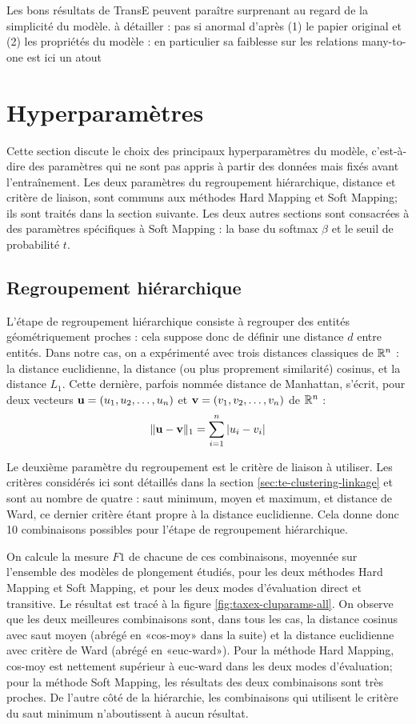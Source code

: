 Les bons résultats de TransE peuvent paraître surprenant au regard de la simplicité du modèle. à détailler : pas si anormal d'après (1) le papier original et (2) les propriétés du modèle : en particulier sa faiblesse sur les relations many-to-one est ici un atout


\section{Hyperparamètres}
\label{sec:te-hp}

Cette section discute le choix des principaux hyperparamètres du modèle, c'est-à-dire des paramètres qui ne sont pas appris à partir des données mais fixés avant l'entraînement. Les deux paramètres du regroupement hiérarchique, distance et critère de liaison, sont communs aux méthodes Hard Mapping et Soft Mapping; ils sont traités dans la section suivante. Les deux autres sections sont consacrées à des paramètres spécifiques à Soft Mapping : la base du softmax $\beta$ et le seuil de probabilité $t$.

\subsection{Regroupement hiérarchique}

L'étape de regroupement hiérarchique consiste à regrouper des entités géométriquement proches : cela suppose donc de définir une distance $d$ entre entités. Dans notre cas, on a expérimenté avec trois distances classiques de $\R^n$ : la distance euclidienne,  la distance (ou plus proprement similarité) cosinus, et la distance $L_1$. Cette dernière, parfois nommée distance de Manhattan, s'écrit, pour deux vecteurs $\bf{u} = (u_1, u_2, \ldots, u_n)$ et $\bf{v} = (v_1, v_2, \ldots, v_n)$ de $\R^n$ :
\begin{equation}
    \| \bf{u - v} \|_1 = \sum_{i=1}^{n} | u_i - v_i |
\end{equation}

Le deuxième paramètre du regroupement est le critère de liaison à utiliser. Les critères considérés ici sont détaillés dans la section \ref{sec:te-clustering-linkage} et sont au nombre de quatre : saut minimum, moyen et maximum, et distance de Ward, ce dernier critère étant propre à la distance euclidienne. Cela donne donc 10 combinaisons possibles pour l'étape de regroupement hiérarchique.

On calcule la mesure $F1$ de chacune de ces combinaisons, moyennée sur l'ensemble des modèles de plongement étudiés, pour les deux méthodes Hard Mapping et Soft Mapping, et pour les deux modes d'évaluation direct et transitive. Le résultat est tracé à la figure \ref{fig:taxex-cluparams-all}. On observe que les deux meilleures combinaisons sont, dans tous les cas, la distance cosinus avec saut moyen (abrégé en «cos-moy» dans la suite) et la distance euclidienne avec critère de Ward (abrégé en «euc-ward»). Pour la méthode Hard Mapping, cos-moy est nettement supérieur à euc-ward dans les deux modes d'évaluation; pour la méthode Soft Mapping, les résultats des deux combinaisons sont très proches. De l'autre côté de la hiérarchie, les combinaisons qui utilisent le critère du saut minimum n'aboutissent à aucun résultat. 

